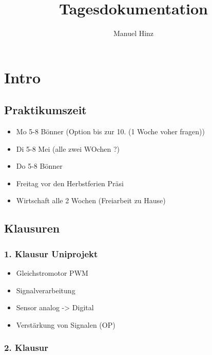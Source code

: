 \documentclass{article}
\author{Manuel Hinz}
\title{Tagesdokumentation}
\begin{document}
\maketitle

\section{Intro}

\subsection{Praktikumszeit}

\begin{itemize}

	\item Mo 5-8 B\"{o}nner (Option bis zur 10. (1 Woche voher fragen))

	\item Di 5-8 Mei (alle zwei WOchen ?)

	\item Do 5-8 B\"{o}nner 

	\item Freitag vor den Herbstferien Pr\"{a}si

	\item Wirtschaft alle 2 Wochen (Freiarbeit zu Hause)

\end{itemize}

\subsection{Klausuren}

\subsubsection{1. Klausur Uniprojekt}

\begin{itemize}

	\item Gleichstromotor PWM

	\item Signalverarbeitung

	\item Sensor analog -> Digital

	\item Verst\"{a}rkung von Signalen (OP)
\end{itemize}

\subsubsection{2. Klausur}
\end{document}
